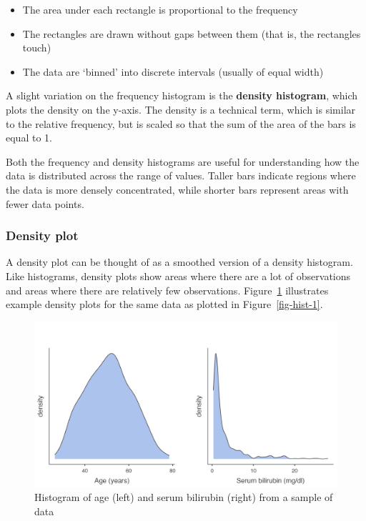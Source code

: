 \documentclass[
  a4paper,
]{memoir}
\providecommand{\tightlist}{%
  \setlength{\itemsep}{0pt}\setlength{\parskip}{0pt}}\usepackage{longtable,booktabs,array}
\begin{document}
\begin{itemize}
\tightlist
\item
  The area under each rectangle is proportional to the frequency
\item
  The rectangles are drawn without gaps between them (that is, the
  rectangles touch)
\item
  The data are `binned' into discrete intervals (usually of equal width)
\end{itemize}

A slight variation on the frequency histogram is the \textbf{density
histogram}, which plots the density on the y-axis. The density is a
technical term, which is similar to the relative frequency, but is
scaled so that the sum of the area of the bars is equal to 1.

Both the frequency and density histograms are useful for understanding
how the data is distributed across the range of values. Taller bars
indicate regions where the data is more densely concentrated, while
shorter bars represent areas with fewer data points.

\hypertarget{density-plot}{%
\subsubsection{Density plot}\label{density-plot}}

A density plot can be thought of as a smoothed version of a density
histogram. Like histograms, density plots show areas where there are a
lot of observations and areas where there are relatively few
observations. Figure~\ref{fig-dens-1} illustrates example density plots
for the same data as plotted in Figure~\ref{fig-hist-1}.

\begin{figure}

{\centering \includegraphics[width=1\textwidth,height=\textheight]{img/mod01/dens-symmetric-skewed.png}

}

\caption{\label{fig-dens-1}Histogram of age (left) and serum bilirubin
(right) from a sample of data}

\end{figure}
\end{document}
